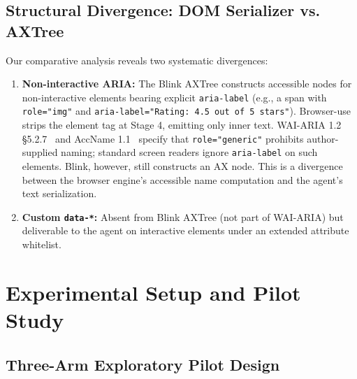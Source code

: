\documentclass[conference]{IEEEtran}
\begin{document}
\subsection{Structural Divergence: DOM Serializer vs. AXTree}

Our comparative analysis reveals two systematic divergences:
\begin{enumerate}
    \item \textbf{Non-interactive ARIA:} The Blink AXTree constructs accessible nodes for non-interactive elements bearing explicit \texttt{aria-label} (e.g., a span with \texttt{role="img"} and \texttt{aria-label="Rating: 4.5 out of 5 stars"}). Browser-use strips the element tag at Stage 4, emitting only inner text. WAI-ARIA 1.2 \S5.2.7~\cite{wai_aria12} and AccName 1.1~\cite{accname11} specify that \texttt{role="generic"} prohibits author-supplied naming; standard screen readers ignore \texttt{aria-label} on such elements. Blink, however, still constructs an AX node. This is a divergence between the browser engine's accessible name computation and the agent's text serialization.
    \item \textbf{Custom \texttt{data-*}:} Absent from Blink AXTree (not part of WAI-ARIA) but deliverable to the agent on interactive elements under an extended attribute whitelist.
\end{enumerate}

\section{Experimental Setup and Pilot Study}
\label{sec:experiment}

\subsection{Three-Arm Exploratory Pilot Design}
\end{document}
